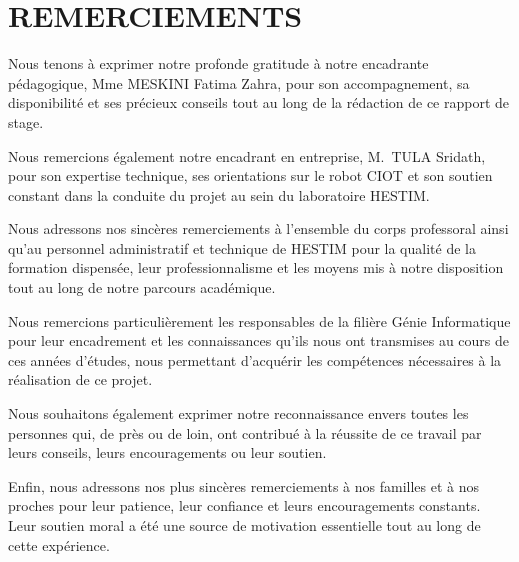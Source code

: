 \section*{\centering REMERCIEMENTS}

Nous tenons à exprimer notre profonde gratitude à notre encadrante pédagogique,
Mme \textsc{MESKINI} Fatima Zahra, pour son accompagnement, sa disponibilité et
ses précieux conseils tout au long de la rédaction de ce rapport de stage.

Nous remercions également notre encadrant en entreprise, M.~\textsc{TULA}
Sridath, pour son expertise technique, ses orientations sur le robot CIOT et son
soutien constant dans la conduite du projet au sein du laboratoire HESTIM.

Nous adressons nos sincères remerciements à l'ensemble du corps professoral ainsi
qu'au personnel administratif et technique de HESTIM pour la qualité de la
formation dispensée, leur professionnalisme et les moyens mis à notre disposition
tout au long de notre parcours académique.

Nous remercions particulièrement les responsables de la filière Génie Informatique
pour leur encadrement et les connaissances qu'ils nous ont transmises au cours de
ces années d'études, nous permettant d'acquérir les compétences nécessaires à la
réalisation de ce projet.

Nous souhaitons également exprimer notre reconnaissance envers toutes les personnes
qui, de près ou de loin, ont contribué à la réussite de ce travail par leurs
conseils, leurs encouragements ou leur soutien.

Enfin, nous adressons nos plus sincères remerciements à nos familles et à nos proches
pour leur patience, leur confiance et leurs encouragements constants. Leur soutien
moral a été une source de motivation essentielle tout au long de cette expérience.
